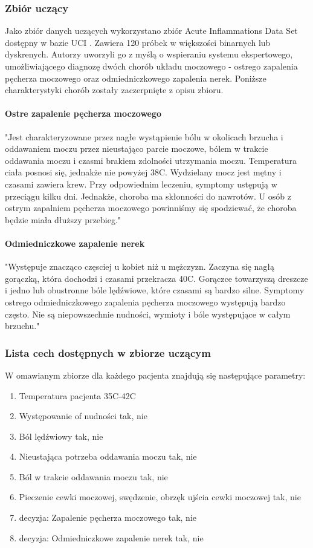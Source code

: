 \documentclass{article}
\begin{document}
\subsubsection{Zbiór uczący}
Jako zbiór danych uczących wykorzystano zbiór Acute Inflammations Data Set dostępny w bazie UCI \cite{data set}. Zawiera 120 próbek w większości binarnych lub dyskrenych. Autorzy uworzyli go z myślą o wspieraniu systemu ekspertowego, umożliwiającego diagnozę dwóch chorób układu moczowego - ostrego zapalenia pęcherza moczowego oraz odmiedniczkowego zapalenia nerek. Poniższe charakterystyki chorób zostały zaczerpnięte z opisu zbioru.

\paragraph{Ostre zapalenie pęcherza moczowego}
"Jest charakteryzowane przez nagłe wystąpienie bólu w okolicach brzucha i oddawaniem moczu przez nieustająco parcie moczowe, bólem w trakcie oddawania moczu i czasmi brakiem zdolności utrzymania moczu. Temperatura ciała posnosi się, jednakże nie powyżej 38C. Wydzielany mocz jest mętny i czasami zawiera krew. Przy odpowiednim leczeniu, symptomy ustępują w przeciągu kilku dni. Jednakże, choroba ma skłonności do nawrotów. U osób z ostrym zapalniem pęcherza moczowego powinniśmy się spodziewać, że choroba będzie miała dłuższy przebieg."

\paragraph{Odmiedniczkowe zapalenie nerek}
"Występuje znacząco częsciej u kobiet niż u mężczyzn. Zaczyna się nagłą gorączką, która dochodzi i czasami przekracza 40C. Gorączce towarzyszą dreszcze i jedno lub obustronne bóle lędźwiowe, które czasami są bardzo silne. Symptomy ostrego odmiedniczkowego zapalenia pęcherza moczowego występują bardzo często. Nie są niepowszechnie nudności, wymioty i bóle występujące w całym brzuchu."

\subsubsection{Lista cech dostępnych w zbiorze uczącym}

W omawianym zbiorze dla każdego pacjenta znajdują się następujące parametry:

\begin{enumerate}
	\item Temperatura pacjenta 35C-42C
	\item Występowanie of nudności tak, nie
	\item Ból lędźwiowy tak, nie
	\item Nieustająca potrzeba oddawania moczu tak, nie
	\item Ból w trakcie oddawania moczu tak, nie
	\item Pieczenie cewki moczowej, swędzenie, obrzęk ujścia cewki moczowej tak, nie
	\item decyzja: Zapalenie pęcherza moczowego tak, nie
	\item decyzja: Odmiedniczkowe zapalenie nerek tak, nie
\end{enumerate}
\end{document}
